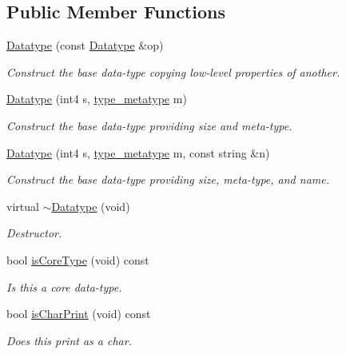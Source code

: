 \subsection*{Public Member Functions}
\begin{DoxyCompactItemize}
\item 
\mbox{\hyperlink{class_datatype_adfdb65c6dc4d64cafc7e042003f183ef}{Datatype}} (const \mbox{\hyperlink{class_datatype}{Datatype}} \&op)
\begin{DoxyCompactList}\small\item\em Construct the base data-\/type copying low-\/level properties of another. \end{DoxyCompactList}\item 
\mbox{\hyperlink{class_datatype_a29369e9251cfb318325b48f715f2aa7f}{Datatype}} (int4 s, \mbox{\hyperlink{type_8hh_aef6429f2523cdf4d415ba04a0209e61f}{type\+\_\+metatype}} m)
\begin{DoxyCompactList}\small\item\em Construct the base data-\/type providing size and meta-\/type. \end{DoxyCompactList}\item 
\mbox{\hyperlink{class_datatype_ada9a0a6dfa2e5fdc91fc81b71c0b5890}{Datatype}} (int4 s, \mbox{\hyperlink{type_8hh_aef6429f2523cdf4d415ba04a0209e61f}{type\+\_\+metatype}} m, const string \&n)
\begin{DoxyCompactList}\small\item\em Construct the base data-\/type providing size, meta-\/type, and name. \end{DoxyCompactList}\item 
virtual \mbox{\hyperlink{class_datatype_ab3ed7d0715b686cb0eef82a3249a5dbe}{$\sim$\+Datatype}} (void)
\begin{DoxyCompactList}\small\item\em Destructor. \end{DoxyCompactList}\item 
bool \mbox{\hyperlink{class_datatype_a15ae1519c41266c3af2b06392b75e1ba}{is\+Core\+Type}} (void) const
\begin{DoxyCompactList}\small\item\em Is this a core data-\/type. \end{DoxyCompactList}\item 
bool \mbox{\hyperlink{class_datatype_a9d1f2c6f358067cce0fea04e9a55a757}{is\+Char\+Print}} (void) const
\begin{DoxyCompactList}\small\item\em Does this print as a \textquotesingle{}char\textquotesingle{}. \end{DoxyCompactList}\item 

\end{DoxyCompactItemize}
